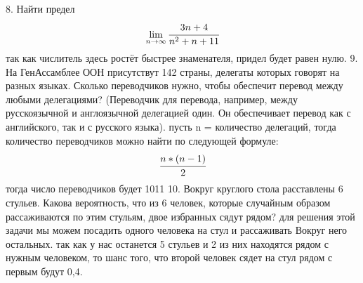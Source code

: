 \documentclass[a4paper,12pt,onecolumn]{article}
\begin{document}
8. Найти предел
$$
\lim_{n\to\infty} \cfrac{3n +4}{n^2+n+11}
$$
так как числитель здесь ростёт быстрее знаменателя, придел будет равен нулю.
9. На ГенАссамблее ООН присутствут 142 страны, делегаты которых говорят на разных языках. Сколько переводчиков нужно, чтобы обеспечит перевод между любыми  делегациями? (Переводчик для перевода, например, между русскоязычной и англоязычной делегацией один. Он обеспечивает перевод как с английского, так и с русского языка). 
пусть n = количество делегаций, тогда количество переводчиков можно найти по следующей формуле:
$$
\cfrac{n*(n -1)}{2}
$$
тогда число переводчиков будет 1011
10. Вокруг  круглого стола расставлены 6 стульев. Какова вероятность, что из  6 человек, которые случайным образом рассаживаются по этим стульям, двое избранных сядут рядом? 
для решения этой задачи мы можем посадить одного человека на стул и рассаживать Вокруг него остальных. так как у нас останется 5 стульев и 2 из них находятся рядом с нужным человеком, то шанс того, что второй человек сядет на стул рядом с первым будут 0,4.
\end{document}
